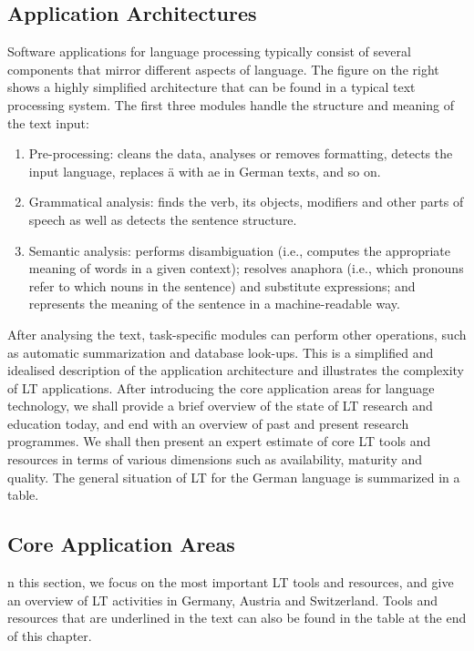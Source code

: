 \documentclass[]{../metanetpaper}
\begin{document}
	\subsection{Application Architectures}
Software applications for language processing typically consist of several components that mirror different aspects of language. The figure on the right shows a highly simplified architecture that can be found in a typical text processing system. The first three modules handle the structure and meaning of the text input:
\begin{enumerate}
\item Pre-processing: cleans the data, analyses or removes formatting, detects the input language, replaces ä with ae in German texts, and so on.
\item Grammatical analysis: finds the verb, its objects, modifiers and other parts of speech as well as detects the sentence structure.
\item Semantic analysis: performs disambiguation (i.e., computes the appropriate meaning of words in a given context); resolves anaphora (i.e., which pronouns refer to which nouns in the sentence) and substitute expressions; and represents the meaning of the sentence in a machine-readable way.
\end{enumerate}
After analysing the text, task-specific modules can perform other operations, such as automatic summarization and database look-ups. This is a simplified and idealised description of the application architecture and illustrates the complexity of LT applications. 
After introducing the core application areas for language technology, we shall provide a brief overview of the state of LT research and education today, and end with an overview of past and present research programmes. We shall then present an expert estimate of core LT tools and resources in terms of various dimensions such as availability, maturity and quality. The general situation of LT for the German language is summarized in a table.

	\subsection{Core Application Areas}
n this section, we focus on the most important LT tools and resources, and give an overview of LT activities in Germany, Austria and Switzerland. Tools and resources that are underlined in the text can also be found in the table at the end of this chapter.  
	
\end{document}
